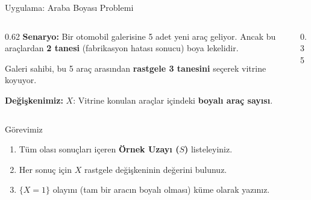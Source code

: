 ﻿\documentclass[light]{lutbeamer}
\begin{document}
\begin{frame}{Uygulama: Araba Boyası Problemi}
    \small
    \begin{columns}[T]
        \begin{column}{0.62\textwidth}
            \textbf{Senaryo:}
            Bir otomobil galerisine 5 adet yeni araç geliyor. 
            Ancak bu araçlardan \textbf{2 tanesi} (fabrikasyon hatası sonucu) boya lekelidir.
            
            \vspace{0.2cm}
            Galeri sahibi, bu 5 araç arasından \textbf{rastgele 3 tanesini} seçerek vitrine koyuyor.
            
            \vspace{0.2cm}
            \textbf{Değişkenimiz:}
            $X$: Vitrine konulan araçlar içindeki \textbf{boyalı araç sayısı}.
        \end{column}
        \begin{column}{0.35\textwidth}
            \centering
        \end{column}
    \end{columns}

    \vspace{0.4cm}
    \begin{block}{Görevimiz}
        \begin{enumerate}
            \item[(a)] Tüm olası sonuçları içeren \textbf{Örnek Uzayı ($S$)} listeleyiniz.
            \item[(b)] Her sonuç için $X$ rastgele değişkeninin değerini bulunuz.
            \item[(c)] $\{X = 1\}$ olayını (tam bir aracın boyalı olması) küme olarak yazınız.
        \end{enumerate}
    \end{block}
\end{frame}
\end{document}
